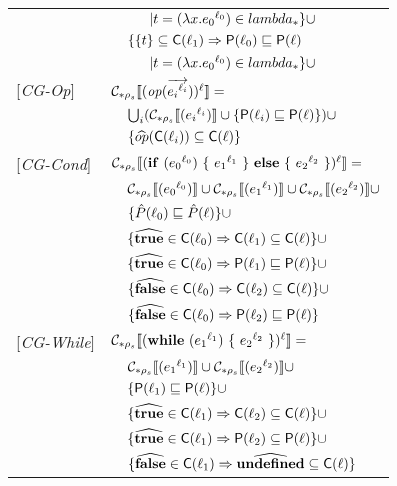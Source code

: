 \documentclass[[12pt,a4paper,twoside,openrigh]{article}
\newcommand{\Pat}[0]{\hat{P}}
\newcommand{\lbt}[1]{{e_#1}^{\ell_#1}}
\begin{document}
\begin{tabular}{l l l l}
&&&$| t = (\lam {x} {\lbt 0}) \in lambda_* \}\cup$\\
&& \multicolumn{2}{l}{$\{\{ t \} \subseteq \mathsf{C}(\ell_1) \Rightarrow \mathsf{P}(\ell_0) \sqsubseteq \mathsf{P}(\ell)$}\\
&&&$| t = (\lam {x} {\lbt 0}) \in lambda_* \}\cup$\\
{[\textit{CG-Op}]}&\multicolumn{3}{l}{$ \genl {\op (\vec{\lbt i})} = $}\\
&&\multicolumn{2}{l}{$\bigcup_i (\gen {\lbt i} \cup \braces{\Pel(\ell_i) \sqsubseteq \Pel(\ell)})\cup$}\\
&&\multicolumn{2}{l}{$\{ \widehat{op} (\mathsf{C}(\ell_i)) \subseteq \mathsf{C}(\ell) \}$}\\
{[\textit{CG-Cond}]}&\multicolumn{3}{l}{$\genl{\cond {\lbt 0} {\lbt 1} {\lbt 2}} = $}\\
&&\multicolumn{2}{l}{$ \gen {\lbt 0} \cup \gen {\lbt 1} \cup \gen {\lbt 2} \cup$}\\
&&\multicolumn{2}{l}{$\braces{\Pat(\ell_0) \sqsubseteq \Pat(\ell)} \cup$} \\
&&\multicolumn{2}{l}{$\{ \widehat{\mathbf{true}} \in \mathsf{C}(\ell_0) \Rightarrow \mathsf{C}(\ell_1) \subseteq \mathsf{C}(\ell) \}\cup$}\\
&&\multicolumn{2}{l}{$\{ \widehat{\mathbf{true}} \in \mathsf{C}(\ell_0) \Rightarrow \mathsf{P}(\ell_1) \sqsubseteq \mathsf{P}(\ell) \}\cup$} \\
&&\multicolumn{2}{l}{$\{ \widehat{\mathbf{false}} \in \mathsf{C}(\ell_0) \Rightarrow \mathsf{C}(\ell_2) \subseteq \mathsf{C}(\ell) \}\cup$}\\
&&\multicolumn{2}{l}{$\{ \widehat{\mathbf{false}} \in \mathsf{C}(\ell_0) \Rightarrow \mathsf{P}(\ell_2) \sqsubseteq \mathsf{P}(\ell) \}$} \\
{[\textit{CG-While}]}&\multicolumn{3}{l}{$\genl {\while {\lbt 1} {\lbt 2}} = $}\\
&&\multicolumn{2}{l}{$ \gen {\lbt 1} \cup \gen {\lbt 2} \cup $}\\
&&\multicolumn{2}{l}{$\{ \mathsf{P}(\ell_1) \sqsubseteq \mathsf{P}(\ell) \} \cup$} \\
&&\multicolumn{2}{l}{$\{ \widehat{\mathbf{true}} \in \mathsf{C}(\ell_1) \Rightarrow \mathsf{C}(\ell_2) \subseteq \mathsf{C}(\ell)  \}\cup$}\\
&&\multicolumn{2}{l}{$\{ \widehat{\mathbf{true}} \in \mathsf{C}(\ell_1) \Rightarrow \mathsf{P}(\ell_2) \subseteq \mathsf{P}(\ell)  \}\cup$}\\
&&\multicolumn{2}{l}{$\{ \widehat{\mathbf{false}} \in \mathsf{C}(\ell_1) \Rightarrow \widehat{\mathbf{undefined}} \subseteq \mathsf{C}(\ell) \}$}\\
\end{tabular}
\end{document}
